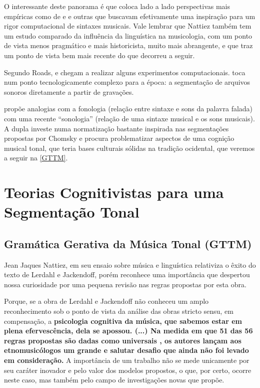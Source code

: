 \documentclass[
	12pt,				%
	openright,			%
	twoside,			%
	a4paper,			%
	english,			%
	french,				%
	spanish,			%
	brazil				%
	]{abntex2}
\begin{document}
O interessante deste panorama é que coloca lado a lado perspectivas mais empíricas como de  e  e outras que buscavam efetivamente uma inspiração para um rigor computacional de sintaxes musicais. Vale lembrar que Nattiez também tem um estudo comparado da influência da linguística na musicologia, com um ponto de vista menos pragmático e mais historicista, muito mais abrangente, e que traz um ponto de vista bem mais recente \cite{nattiez2004modelos} do que decorreu a seguir.


Segundo Roads,  e  chegam a realizar alguns experimentos computacionais.  toca num ponto tecnologicamente complexo para a época: a segmentação de arquivos sonoros diretamente a partir de gravações. 

 propõe analogias com a fonologia (relação entre sintaxe e sons da palavra falada) com uma recente “sonologia” (relação de uma sintaxe musical e os sons musicais). A dupla   investe numa normatização bastante inspirada nas segmentações propostas por Chomsky e procura problematizar aspectos de uma cognição musical tonal, que teria bases culturais sólidas na tradição ocidental, que veremos a seguir na \autoref{GTTM}.



\chapter{Teorias Cognitivistas para uma Segmentação Tonal}

\section{Gramática Gerativa da Música Tonal (GTTM)}
\label{GTTM}

Jean Jaques Nattiez, em seu ensaio sobre música e linguística \cite{nattiez2004modelos} relativiza o êxito do texto de Lerdahl e Jackendoff, porém reconhece uma importância  que despertou nossa curiosidade por uma pequena revisão nas regras propostas por esta obra.

\begin{citacao}
Porque, se a obra de Lerdahl e Jackendoff não conheceu um amplo reconhecimento sob o ponto de vista da análise das obras stricto sensu, em compensação, a \textbf{psicologia cognitiva da música, que sabemos estar em plena efervescência, dela se apossou. (...) Na medida em que 51 das 56 regras propostas são dadas como universais \cite[ p.345-352]{lerdahl1983generative}, os autores lançam aos etnomusicólogos um grande e salutar desafio que ainda não foi levado em consideração.} A importância de um trabalho não se mede unicamente por seu caráter inovador e pelo valor dos modelos propostos, o que, por certo, ocorre neste caso, mas também pelo campo de investigações novas que propõe.
\cite[ grifos nossos.]{nattiez2004modelos}
\end{citacao}
\end{document}
